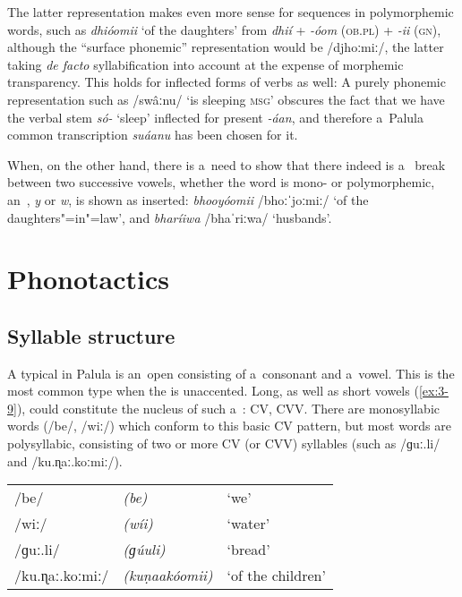 The latter representation makes even more sense for sequences in polymorphemic words, such as \textit{dhióomii} `of the daughters' from \textit{dhií} + \textit{-óom} (\textsc{ob.pl)} + \textit{-ii} (\textsc{gn)}, although the ``surface phonemic'' representation would be /djhoːmiː/, the latter taking \textit{de facto} syllabification into account at the expense of morphemic transparency. This holds for inflected forms of verbs as well: A purely phonemic representation such as /swâːnu/ `is sleeping \textsc{msg}' obscures the fact that we have the verbal stem \textit{só-} `sleep' inflected for present  \textit{-áan}, and therefore a~Palula common transcription \textit{suáanu} has been chosen for it.


When, on the other hand, there is a~need to show that there indeed is a~ break between two successive vowels, whether the word is mono- or polymorphemic, an~, \textit{y} or \textit{w}, is shown as inserted: \textit{bhooyóomii} /bhoːˈjoːmiː/ `of the daughters"=in"=law', and \textit{bharíiwa} /bhaˈriːwa/ `husbands'.


\section{Phonotactics}
\label{sec:3-3}

\subsection{Syllable structure}
\label{subsec:3-3-1}


A typical  in Palula is an~open  consisting of a~consonant and a~vowel. This is the most common type when the  is unaccented. Long, as well as short vowels (\ref{ex:3-9}), could constitute the nucleus of such a~: CV, CVV. There are monosyllabic words (/be/, /wiː/) which conform to this basic CV pattern, but most words are polysyllabic, consisting of two or more CV (or CVV) syllables (such as /ɡuː.li/ and /ku.ɳaː.koːmiː/).


\begin{exe}
\extab
\label{ex:3-9}
\begin{tabular}{ l l l }
/be/ &
\textit{(be)} &
`we'\\
/wiː/ &
\textit{(wíi)} &
`water'\\
/ɡuː.li/ &
\textit{(ɡúuli)} &
`bread'\\
/ku.ɳaː.koːmiː/ &
\textit{(kuṇaakóomii)} &
`of the children'\\
\end{tabular}
\end{exe}




